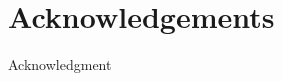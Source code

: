 \documentclass[../main.tex]{subfiles}
\begin{document}
\section{Acknowledgements}
\label{sec:acknowledgements}

Acknowledgment
\end{document}
